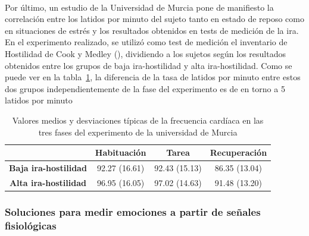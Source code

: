 \paragraph{}
Por último, un estudio de la Universidad de Murcia \citep{breva2000ira} pone de manifiesto la correlación entre los latidos por minuto del sujeto tanto en estado de reposo como en situaciones de estrés y los resultados obtenidos en tests de medición de la ira. En el experimento realizado, se utilizó como test de medición el inventario de Hostilidad de Cook y Medley (\citeyear{cook1954proposed}), dividiendo a los sujetos según los resultados obtenidos entre los grupos de baja ira-hostilidad y alta ira-hostilidad. Como se puede ver en la tabla~\ref{tab:frecCard}, la diferencia de la tasa de latidos por minuto entre estos dos grupos independientemente de la fase del experimento es de en torno a 5 latidos por minuto

\begin{table}[h]
\centering
\caption{Valores medios y desviaciones típicas de la frecuencia cardíaca en las tres fases del experimento de la universidad de Murcia}
\label{tab:frecCard}
\begin{tabular}{c|c|c|c|}
\cline{2-4}
                                                   & \textbf{Habituación} & \textbf{Tarea} & \textbf{Recuperación} \\ \hline
\multicolumn{1}{|c|}{\textbf{Baja ira-hostilidad}} & 92.27 (16.61)        & 92.43 (15.13)  & 86.35 (13.04)         \\ \hline
\multicolumn{1}{|c|}{\textbf{Alta ira-hostilidad}} & 96.95 (16.05)        & 97.02 (14.63)  & 91.48 (13.20)         \\ \hline
\end{tabular}
\end{table}


\subsubsection{Soluciones para medir emociones a partir de señales fisiológicas}

